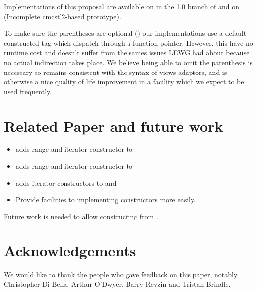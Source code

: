 \documentclass{wg21}
\begin{document}
Implementations of this proposal are available on in the 1.0 branch of \cite{Range V3} and on \cite{Compiler Explorer} (Incomplete cmcstl2-based prototype).

To make sure the parentheses are optional () our implementations use a default constructed
tag which dispatch through a function pointer.
However, this have no runtime cost
and doesn't suffer from the sames issues LEWG had about  because no actual indirection takes place.
We believe being able to omit the parenthesis is necessary so  remains consistent with the syntax of views adaptors,
and is otherwise a nice quality of life improvement in a facility which we expect to be used frequently.


\section{Related Paper and future work}

\begin{itemize}
	\item \cite{P1391} adds range and iterator constructor to 
	\item \cite{P1394} adds range and iterator constructor to 
    \item \cite{P1425} adds iterator constructors to  and 
    \item \cite{P1419} Provide facilities to implementing  constructors more easily.
\end{itemize}

Future work is needed to allow constructing  from .

\section{Acknowledgements}
We would like to thank the people who gave feedback on this paper, notably Christopher Di Bella, Arthur O'Dwyer, Barry Revzin
and Tristan Brindle.\\
\end{document}
